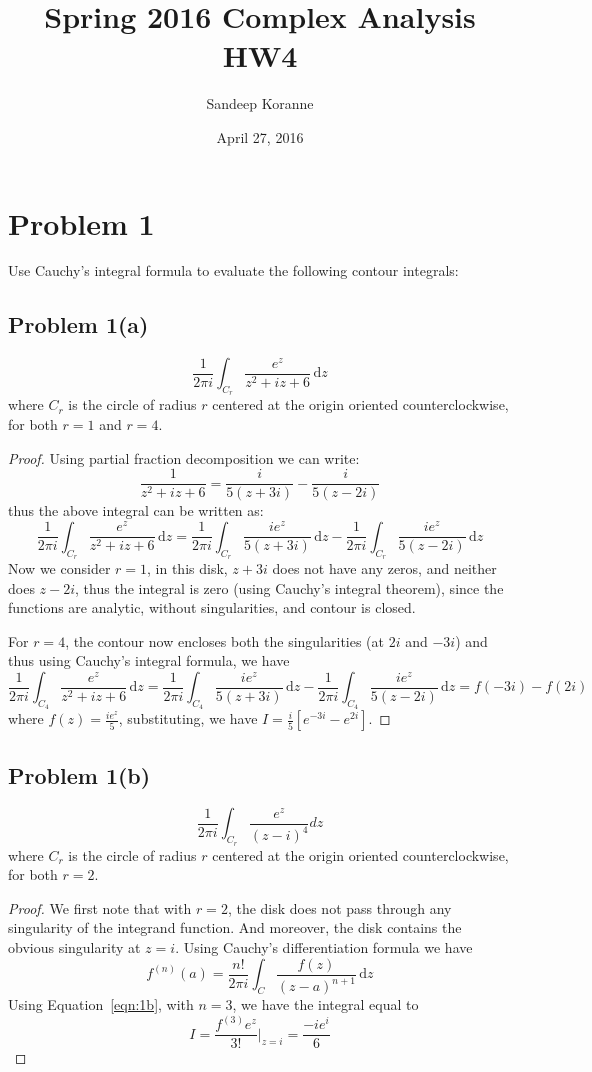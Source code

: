 \documentclass{article}[12pt]
\def\D{\mathrm{d}}
\begin{document}
\title{Spring 2016 Complex Analysis HW4}
\author{Sandeep Koranne}
\date{April 27, 2016}
\maketitle


\section*{Problem 1}
Use Cauchy's integral formula to evaluate the following contour integrals:

\subsection*{Problem 1(a)}
\[
\frac{1}{2\pi i} \int_{C_r} \frac{e^z}{z^2+iz+6}\,\D z
\]
where $C_r$ is the circle of radius $r$ centered at the origin oriented
counterclockwise, for both $r=1$ and $r=4$.
\begin{proof}
Using partial fraction decomposition we can write:
\[
\frac{1}{z^2+iz+6} = \frac{i}{5(z+3i)} - \frac{i}{5(z-2i)}
\]
thus the above integral can be written as:
\[
\frac{1}{2\pi i} \int_{C_r} \frac{e^z}{z^2+iz+6}\,\D z = 
\frac{1}{2\pi i} \int_{C_r} \frac{ie^z}{5(z+3i)}\,\D z -
\frac{1}{2\pi i} \int_{C_r} \frac{ie^z}{5(z-2i)} \,\D z
\]
Now we consider $r=1$, in this disk, $z+3i$ does not have any zeros,
and neither does $z-2i$, thus the integral is zero (using Cauchy's integral
theorem), since the functions are analytic, without singularities, and
contour is closed.

For $r=4$, the contour now encloses both the singularities (at $2i$ and
$-3i$) and thus using Cauchy's integral formula, we have
\[
\frac{1}{2\pi i} \int_{C_4} \frac{e^z}{z^2+iz+6}\,\D z = 
\frac{1}{2\pi i} \int_{C_4} \frac{ie^z}{5(z+3i)}\,\D z -
\frac{1}{2\pi i} \int_{C_4} \frac{ie^z}{5(z-2i)} \,\D z =
f(-3i)-f(2i)
\]
where $f(z)=\frac{ie^z}{5}$, substituting, we 
have $I=\frac{i}{5}[e^{-3i}-e^{2i}]$.
\end{proof}

\subsection*{Problem 1(b)}
\[
\frac{1}{2\pi i} \int_{C_r} \frac{e^z}{(z-i)^4} dz
\]
where $C_r$ is the circle of radius $r$ centered at the origin oriented
counterclockwise, for both $r=2$.

\begin{proof}
We first note that with $r=2$, the disk does not pass through
any singularity of the integrand function. And moreover, the disk
contains the obvious singularity at $z=i$.
Using Cauchy's differentiation formula we have
\begin{equation}
f^{(n)}(a) = \frac{n!}{2\pi i} \int_C \frac{f(z)}{(z-a)^{n+1}}\, \D z \label{eqn:1b}
\end{equation}
Using Equation~\ref{eqn:1b}, with $n=3$, we have the integral equal to
\[
I = \frac{f^{(3)}e^z}{3!}|_{z=i} = \frac{-ie^i}{6}
\]
\end{proof}
\end{document}
